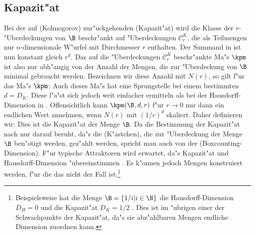 \subsection{Kapazit"at}
\label{chapcapacity}
Bei der auf \autor(Kolmogorov) zur"uckgehenden \begriff(Kapazit"at) wird die Klasse der
$r$-"Uberdeckungen von $\B$ beschr"ankt auf "Uberdeckungen $\mathcal C^K_r$, die als Teilmengen nur
$n$-dimensionale W"urfel mit Durchmesser $r$ enthalten. Der Summand in
 ist nun konstant gleich $r^d$. Das auf die "Uberdeckungen $\mathcal C^K_r$
beschr"ankte Ma"s $\kpm$ ist also nur abh"angig von der Anzahl der Mengen, die zur "Uberdeckung
von $\B$ minimal gebraucht werden. Bezeichnen wir diese Anzahl mit $N(r)$, so gilt f"ur das
Ma"s $\kpm$:
Auch dieses Ma"s hat eine Sprungstelle bei einem bestimmten $d=D_K$. Diese l"a"st sich 
jedoch weit einfacher ermitteln als bei der Hausdorff-Dimension in
. Offensichtlich kann $\kpm(\B,d,r)$ f"ur $r\to0$ nur dann ein
endlichen Wert annehmen, wenn $N(r)$ mit $(1/r)^d$ skaliert. Daher definieren wir:
Dies ist die Kapazit"at der Menge $\B$. Da die Bestimmung der Kapazit"at nach
 nur darauf beruht, da"s die \naja(K"astchen), die zur "Uberdeckung der
Menge $\B$ ben"otigt werden, gez"ahlt werden, spricht man auch von der
\begriff(Boxcounting-Dimension). F"ur typische Attraktoren
wird erwartet, da"s Kapazit"at und Hausdorff-Dimension "ubereinstimmen
\cite{Farmer-ott-yorke}. Es k"onnen jedoch Mengen konstruiert werden, f"ur die das nicht der 
Fall ist.\footnote{Beispielsweise hat die Menge $\B=\{1/i\vert i\in\N\}$ die 
Hausdorff-Dimension $D_H=0$ und die Kapazit"at $D_K=1/2$ \cite{Leven89}. Dies ist im "ubrigen einer der
Schwachpunkte der Kapazit"at, da"s sie abz"ahlbaren Mengen endliche Dimension zuordnen kann.}

